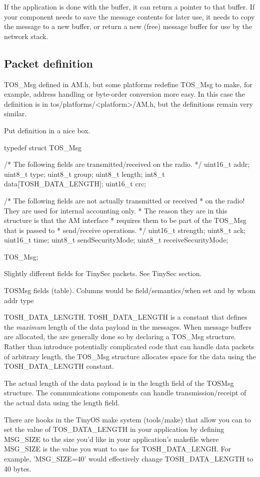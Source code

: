 If the application is done with the buffer, it can return a pointer to
that buffer. If your component needs to save the message contents for
later use, it needs to copy the message to a new buffer, or return a
new (free) message buffer for use by the network stack.

\subsection{Packet definition}

TOS_Msg defined in AM.h, but some platforms redefine TOS_Msg to make,
for example, address handling or byte-order conversion more easy. In
this case the definition is in tos/platforms/<platform>/AM.h, but the
definitions remain very similar.

Put definition in a nice box.

typedef struct TOS_Msg
{
  /* The following fields are transmitted/received on the radio. */
  uint16_t addr;
  uint8_t type;
  uint8_t group;
  uint8_t length;
  int8_t data[TOSH_DATA_LENGTH];
  uint16_t crc;

  /* The following fields are not actually transmitted or received 
   * on the radio! They are used for internal accounting only.
   * The reason they are in this structure is that the AM interface
   * requires them to be part of the TOS_Msg that is passed to
   * send/receive operations.
   */
  uint16_t strength;
  uint8_t ack;
  uint16_t time;
  uint8_t sendSecurityMode;
  uint8_t receiveSecurityMode;  
} TOS_Msg;

Slightly different fields for TinySec packets. See TinySec section.

TOSMsg fields (table). 
Columns would be field/semantics/when set and by whom
addr 
type

TOSH_DATA_LENGTH. TOSH_DATA_LENGTH is a constant that defines the 
\emph{maximum} length of the data payload in the messages. When 
message buffers are allocated, the are generally done so by declaring
a TOS_Msg structure. Rather than introduce potentially complicated 
code that can handle data packets of arbitrary length, the TOS_Msg
structure allocates space for the data using the TOSH_DATA_LENGTH 
constant. 

The actual length of
the data payload is in the length field of the TOSMsg structure. The 
communications components can handle transmission/receipt of the 
actual data using the length field.

There are hooks in the TinyOS make system (tools/make) that allow
you can to set the value of TOS_DATA_LENGTH in your application by 
defining MSG_SIZE to the size you'd like in your application's makefile
where MSG_SIZE is the value you want to use for TOSH_DATA_LENGH.
For example, 'MSG_SIZE=40' would effectively change TOSH_DATA_LENGTH to 
40 bytes. 


